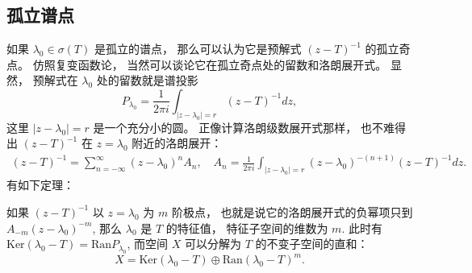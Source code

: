 \subsection{孤立谱点}
如果 $\lambda_0\in\sigma(T)$ 是孤立的谱点， 那么可以认为它是预解式 $(z-T)^{-1}$ 的孤立奇点。 仿照复变函数论， 当然可以谈论它在孤立奇点处的留数和洛朗展开式。 显然， 预解式在 $\lambda_0$ 处的留数就是谱投影
$$
P_{\lambda_0}=\frac{1}{2\pi i}\int_{|z-\lambda_0|=r}(z-T)^{-1}dz,
$$
这里 $|z-\lambda_0|=r$ 是一个充分小的圆。 正像计算洛朗级数展开式那样， 也不难得出 $(z-T)^{-1}$ 在 $z=\lambda_0$ 附近的洛朗展开：
$$
\begin{aligned}
(z-T)^{-1}
=\sum_{n=-\infty}^\infty(z-\lambda_0)^nA_n,
\quad
A_n=\frac{1}{2\pi i}\int_{|z-\lambda_0|=r}(z-\lambda_0)^{-(n+1)}(z-T)^{-1}dz.
\end{aligned}
$$
有如下定理：
\begin{theorem}{}
如果 $(z-T)^{-1}$ 以 $z=\lambda_0$ 为 $m$ 阶极点， 也就是说它的洛朗展开式的负幂项只到 $A_{-m}(z-\lambda_0)^{-m}$, 那么 $\lambda_0$ 是 $T$ 的特征值， 特征子空间的维数为 $m$. 此时有 $\text{Ker}(\lambda_0-T)=\text{Ran}P_{\lambda_0}$, 而空间 $X$ 可以分解为 $T$ 的不变子空间的直和：
$$
X=\text{Ker}(\lambda_0-T)\oplus \text{Ran}(\lambda_0-T)^m.
$$
\end{theorem}